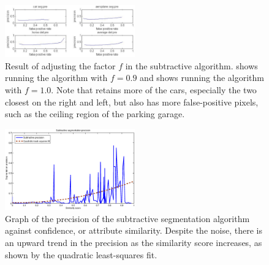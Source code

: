 \documentclass[10pt,twocolumn,letterpaper]{article}
\begin{document}
\begin{figure}
\centering
\includegraphics[width=0.5\textwidth]{figures/add_res/roc_seg.png.eps}
\caption{Result of adjusting the factor $f$ in the subtractive
algorithm.  shows running the algorithm with $f=0.9$
and  shows running the algorithm with $f=1.0$.  Note
that  retains more of the cars, especially the two
closest on the right and left, but also has more false-positive
pixels, such as the ceiling region of the parking garage.}
\label{fig:roc_seg}
\end{figure}

\begin{figure}
\centering
\includegraphics[width=0.5\textwidth]{figures/SubSegPrec.eps}
\caption{Graph of the precision of the subtractive segmentation
algorithm against confidence, or attribute similarity.  Despite
the noise, there is an upward trend in the precision
as the similarity score increases, as shown by the 
quadratic least-squares fit.}
\label{fig:sub_seg_prec}
\end{figure}



\end{document}
